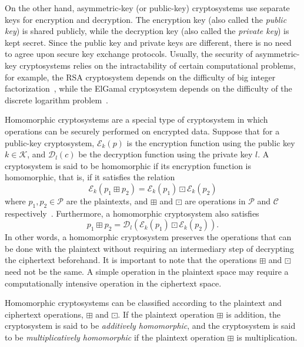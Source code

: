 On the other hand, asymmetric-key (or public-key) cryptosystems use separate keys for encryption and decryption. The encryption key (also called the \textit{public key}) is shared publicly, while the decryption key (also called the \textit{private key}) is kept secret. Since the public key and private keys are different, there is no need to agree upon secure key exchange protocols. Usually, the security of asymmetric-key cryptosystems relies on the intractability of certain computational problems, for example, the RSA cryptosystem depends on the difficulty of big integer factorization~\cite{rivest_method_1978}, while the ElGamal cryptosystem depends on the difficulty of the discrete logarithm problem~\cite{blakley_public_1985}.

Homomorphic cryptosystems are a special type of cryptosystem in which operations can be securely performed on encrypted data. Suppose that for a public-key cryptosystem, $\mathcal{E}_k \left(p \right)$ is the encryption function using the public key $k \in \mathcal{K}$, and $\mathcal{D}_l \left(c \right)$ be the decryption function using the private key $l$. A cryptosystem is said to be homomorphic if its encryption function is homomorphic, that is, if it satisfies the relation
\begin{equation}
    \mathcal{E}_k \left(p_1 \boxplus p_2\right) = \mathcal{E}_k \left(p_1\right) \boxdot \mathcal{E}_k \left(p_2\right)
\end{equation}
where $p_1, p_2 \in \mathcal{P}$ are the plaintexts, and $\boxplus$ and $\boxdot$ are operations in $\mathcal{P}$ and $\mathcal{C}$ respectively~\cite{fontaine_survey_2007}. Furthermore, a homomorphic cryptosystem also satisfies~\cite{li_elliptic_2012}
\begin{equation}
    p_1 \boxplus p_2 = \mathcal{D}_l \left( \mathcal{E}_k \left(p_1\right) \boxdot \mathcal{E}_k \left(p_2\right) \right).
\end{equation}
In other words, a homomorphic cryptosystem preserves the operations that can be done with the plaintext without requiring an intermediary step of decrypting the ciphertext beforehand. It is important to note that the operations $\boxplus$ and $\boxdot$ need not be the same. A simple operation in the plaintext space may require a computationally intensive operation in the ciphertext space.

Homomorphic cryptosystems can be classified according to the plaintext and ciphertext operations, $\boxplus$ and $\boxdot$. If the plaintext operation $\boxplus$ is addition, the cryptosystem is said to be \textit{additively homomorphic}, and the cryptosystem is said to be \textit{multiplicatively homomorphic} if the plaintext operation $\boxplus$ is multiplication.

